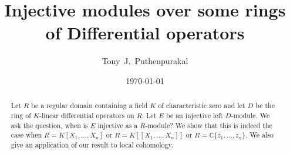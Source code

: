 \documentclass{amsart}
\theoremstyle{plain}
\theoremstyle{definition}
\theoremstyle{remark}
\numberwithin{equation}{theorem}
\begin{document}
\title{Injective modules over some rings of Differential operators}
 \author{Tony~J.~Puthenpurakal}
\date{\today}
\address{Department of Mathematics, Indian Institute of Technology Bombay, Powai, Mumbai 400 076}



\begin{abstract}
Let $R$ be a regular domain containing a field $K$ of characteristic zero and let $D$ be the ring of $K$-linear differential operators on $R$. Let $E$ be an injective left $D$-module. We ask the question, when is $E$ injective as a
$R$-module? We show that this is indeed the case when $R = K[X_1,\ldots,X_n]$ or $R = K[[X_1,\ldots,X_n]]$ or $R = \mathbb{C}\{z_1,\ldots,z_n\}$. We also give an application of our result to local cohomology.
\end{abstract}

\maketitle
\end{document}
